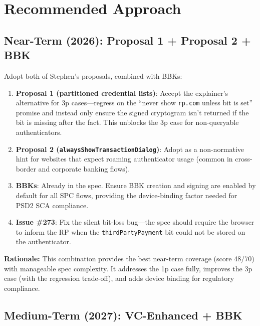 \documentclass[12pt,a4paper]{article}
\begin{document}
\section{Recommended Approach}

\subsection{Near-Term (2026): Proposal 1 + Proposal 2 + BBK}

Adopt both of Stephen's proposals, combined with BBKs:

\begin{enumerate}[noitemsep,topsep=4pt]
  \item \textbf{Proposal 1 (partitioned credential lists)}: Accept the explainer's alternative for 3p cases---regress on the ``never show \texttt{rp.com} unless bit is set'' promise and instead only ensure the signed cryptogram isn't returned if the bit is missing after the fact. This unblocks the 3p case for non-queryable authenticators.

  \item \textbf{Proposal 2 (\texttt{alwaysShowTransactionDialog})}: Adopt as a non-normative hint for websites that expect roaming authenticator usage (common in cross-border and corporate banking flows).

  \item \textbf{BBKs}: Already in the spec. Ensure BBK creation and signing are enabled by default for all SPC flows, providing the device-binding factor needed for PSD2 SCA compliance.

  \item \textbf{Issue \#273}: Fix the silent bit-loss bug---the spec should require the browser to inform the RP when the \texttt{thirdPartyPayment} bit could not be stored on the authenticator.
\end{enumerate}

\noindent\textbf{Rationale:} This combination provides the best near-term coverage (score 48/70) with manageable spec complexity. It addresses the 1p case fully, improves the 3p case (with the regression trade-off), and adds device binding for regulatory compliance.

\subsection{Medium-Term (2027): VC-Enhanced + BBK}
\end{document}
